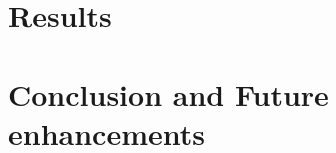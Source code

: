 \documentclass[%
        final,
        notitlepage,
        narroweqnarray,
        inline,
        ]{ieee}
\begin{document}
 
\section{Results}


\section{Conclusion and Future enhancements}






\end{document}
